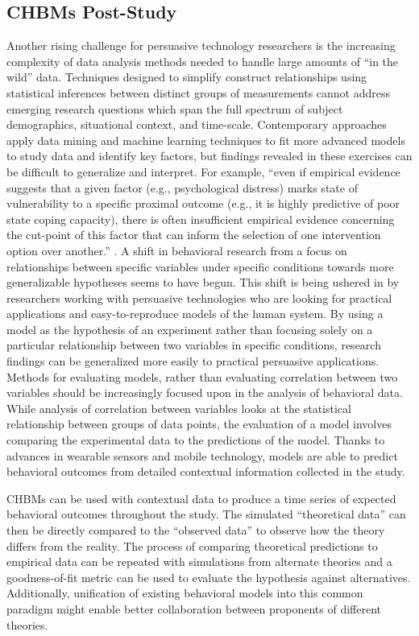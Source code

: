 \documentclass[runningheads,a4paper]{llncs}
\begin{document}
\subsection{CHBMs Post-Study}
Another rising challenge for persuasive technology researchers is the increasing complexity of data analysis methods needed to handle large amounts of ``in the wild'' data.
Techniques designed to simplify construct relationships using statistical inferences between distinct groups of measurements cannot address emerging research questions which span the full spectrum of subject demographics, situational context, and time-scale. 
Contemporary approaches apply data mining and machine learning techniques to fit more advanced models to study data and identify key factors, but findings revealed in these exercises can be difficult to generalize and interpret.
For example, ``even if empirical evidence suggests that a given factor (e.g., psychological distress) marks state of vulnerability to a specific proximal outcome (e.g., it is highly predictive of poor state coping capacity), there is often insufficient empirical evidence concerning the cut-point of this factor that can inform the selection of one intervention option over another.'' \cite{nahum2014}.
A shift in behavioral research from a focus on relationships between specific variables under specific conditions towards more generalizable hypotheses seems to have begun. 
This shift is being ushered in by researchers working with persuasive technologies who are looking for practical applications and easy-to-reproduce models of the human system.
By using a model as the hypothesis of an experiment rather than focusing solely on a particular relationship between two variables in specific conditions, research findings can be generalized more easily to practical persuasive applications.
Methods for evaluating models, rather than evaluating correlation between two variables should be increasingly focused upon in the analysis of behavioral data.
While analysis of correlation between variables looks at the statistical relationship between groups of data points, the evaluation of a model involves comparing the experimental data to the predictions of the model.
Thanks to advances in wearable sensors and mobile technology, models are able to predict behavioral outcomes from detailed contextual information collected in the study.


CHBMs can be used with contextual data to produce a time series of expected behavioral outcomes throughout the study.
The simulated ``theoretical data'' can then be directly compared to the ``observed data'' to observe how the theory differs from the reality.
The process of comparing theoretical predictions to empirical data can be repeated with simulations from alternate theories and a goodness-of-fit metric can be used to evaluate the hypothesis against alternatives.
Additionally, unification of existing behavioral models into this common paradigm might enable better collaboration between proponents of different theories.
\end{document}
